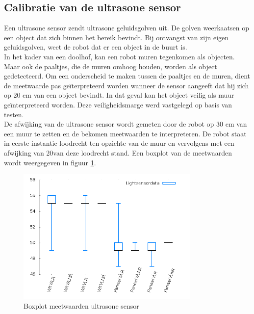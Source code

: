\documentclass[tt3]{penoverslag}
\begin{document}
\subsection{Calibratie van de ultrasone sensor} %
\label{ssec:calibUS}
Een ultrasone sensor zendt ultrasone geluidsgolven uit. De golven weerkaatsen op een object dat zich binnen het bereik bevindt. Bij ontvangst van zijn eigen geluidsgolven, weet de robot dat er een object in de buurt is.\\
In het kader van een doolhof, kan een robot muren tegenkomen als objecten. Maar ook de paaltjes, die de muren omhoog houden, worden als object gedetecteerd. Om een onderscheid te maken tussen de paaltjes en de muren, dient de meetwaarde pas ge\"iterpreteerd worden wanneer de sensor aangeeft dat hij zich op 20 cm van een object bevindt. In dat geval kan het object veilig als muur geïnterpreteerd worden. Deze veiligheidsmarge werd vastgelegd op basis van testen.\\
De afwijking van de ultrasone sensor wordt gemeten door de robot op 30 cm van een muur te zetten en de bekomen meetwaarden te interpreteren. De robot staat in eerste instantie loodrecht ten opzichte van de muur en vervolgens met een afwijking van 20\degree van deze loodrecht stand. Een boxplot van de meetwaarden wordt weergegeven in figuur \ref{fig:boxUltra}.


\begin{figure}[tbp]
\begin{center}
    \includegraphics[width=0.8\textwidth]{boxplotLichtSensor}
    \caption{Boxplot meetwaarden ultrasone sensor}
    \label{fig:boxUltra}
\end{center}
\end{figure}
\end{document}

